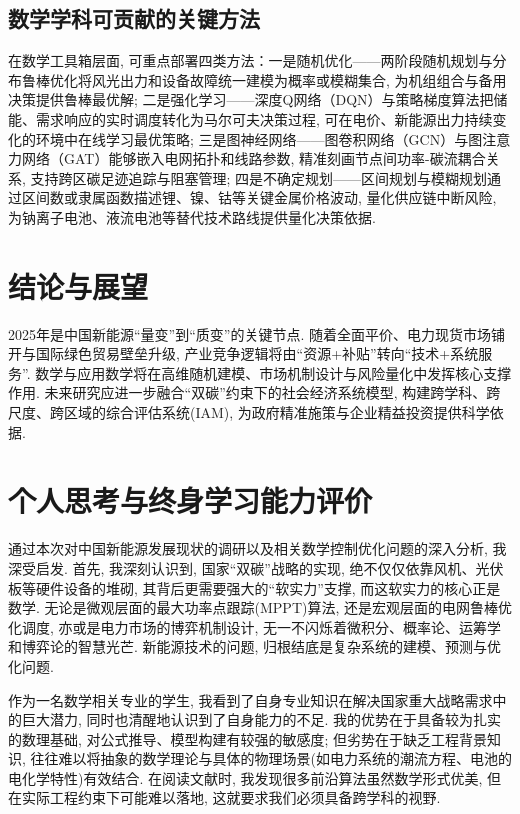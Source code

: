 \documentclass[a4paper,11pt,AutoFakeBold]{article}
\begin{document}
\subsection{数学学科可贡献的关键方法}
在数学工具箱层面, 可重点部署四类方法：一是随机优化——两阶段随机规划与分布鲁棒优化将风光出力和设备故障统一建模为概率或模糊集合, 为机组组合与备用决策提供鲁棒最优解; 二是强化学习——深度Q网络（DQN）与策略梯度算法把储能、需求响应的实时调度转化为马尔可夫决策过程, 可在电价、新能源出力持续变化的环境中在线学习最优策略; 三是图神经网络——图卷积网络（GCN）与图注意力网络（GAT）能够嵌入电网拓扑和线路参数, 精准刻画节点间功率-碳流耦合关系, 支持跨区碳足迹追踪与阻塞管理; 四是不确定规划——区间规划与模糊规划通过区间数或隶属函数描述锂、镍、钴等关键金属价格波动, 量化供应链中断风险, 为钠离子电池、液流电池等替代技术路线提供量化决策依据. 

\section{结论与展望}
2025年是中国新能源“量变”到“质变”的关键节点. 随着全面平价、电力现货市场铺开与国际绿色贸易壁垒升级, 产业竞争逻辑将由“资源+补贴”转向“技术+系统服务”. 数学与应用数学将在高维随机建模、市场机制设计与风险量化中发挥核心支撑作用. 未来研究应进一步融合“双碳”约束下的社会经济系统模型, 构建跨学科、跨尺度、跨区域的综合评估系统(IAM), 为政府精准施策与企业精益投资提供科学依据. 


\section{个人思考与终身学习能力评价}

通过本次对中国新能源发展现状的调研以及相关数学控制优化问题的深入分析, 我深受启发. 首先, 我深刻认识到, 国家“双碳”战略的实现, 绝不仅仅依靠风机、光伏板等硬件设备的堆砌, 其背后更需要强大的“软实力”支撑, 而这软实力的核心正是数学. 无论是微观层面的最大功率点跟踪(MPPT)算法, 还是宏观层面的电网鲁棒优化调度, 亦或是电力市场的博弈机制设计, 无一不闪烁着微积分、概率论、运筹学和博弈论的智慧光芒. 新能源技术的问题, 归根结底是复杂系统的建模、预测与优化问题. 

作为一名数学相关专业的学生, 我看到了自身专业知识在解决国家重大战略需求中的巨大潜力, 同时也清醒地认识到了自身能力的不足. 我的优势在于具备较为扎实的数理基础, 对公式推导、模型构建有较强的敏感度; 但劣势在于缺乏工程背景知识, 往往难以将抽象的数学理论与具体的物理场景(如电力系统的潮流方程、电池的电化学特性)有效结合. 在阅读文献时, 我发现很多前沿算法虽然数学形式优美, 但在实际工程约束下可能难以落地, 这就要求我们必须具备跨学科的视野. 
\end{document}
